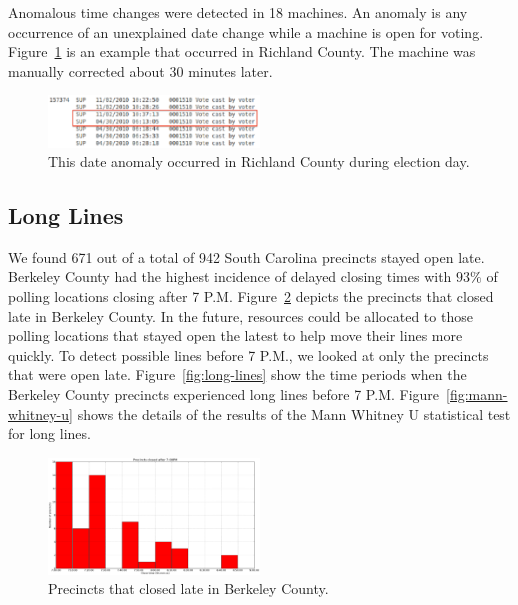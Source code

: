 \documentclass[letterpaper,twocolumn,10pt]{article}
\begin{document}
Anomalous time changes were detected in 18 machines. An anomaly is any
occurrence of an unexplained date change while a machine is open for
voting. Figure~\ref{fig:date-anomaly} is an example that occurred in Richland
County. The machine was manually corrected about 30 minutes later.  

\begin{figure}[htbp]
\begin{center}
    \includegraphics[width=0.5\textwidth,height=0.1\textheight]{DateAnomaly.eps}
\end{center}
\caption{This date anomaly occurred in Richland County during election day.}
\label{fig:date-anomaly}
\end{figure}

\subsection{Long Lines}
We found 671 out of a total of 942 South Carolina precincts stayed open
late. Berkeley County had the highest incidence of delayed closing times with
$93\%$ of polling locations closing after 7
P.M\@. Figure~\ref{fig:precincts-closed-late} depicts the precincts 
that closed late in Berkeley County. In the future, resources could be allocated
to those polling locations that stayed open the latest to help move their lines
more quickly. To detect possible lines before 7 P.M., we looked at only the
precincts that were open late. Figure~\ref{fig:long-lines} show the time periods
when the Berkeley County precincts experienced long lines before 7
P.M. Figure~\ref{fig:mann-whitney-u} shows the details of the results of the
Mann Whitney U statistical test for long lines.

\begin{figure}[htbp]
\begin{center}
    \includegraphics[width=0.5\textwidth,height=0.3\textheight]{berkeleyopenlate.eps}
\end{center}
\caption{Precincts that closed late in Berkeley County.}
\label{fig:precincts-closed-late}
\end{figure}
\end{document}
